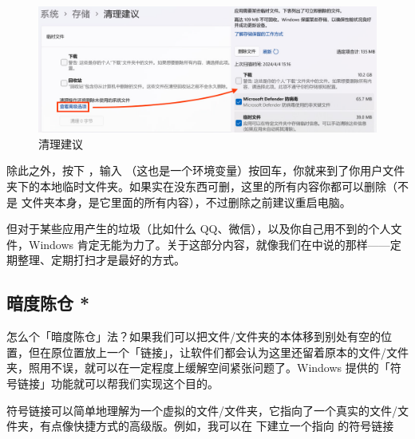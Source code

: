 {\begin{figure}[htb!]
  \centering
  \includegraphics[width=.9\textwidth]{assets/advanced/Clean_Suggestion.jpg}
  \caption{清理建议}
  \label{fig:Clean_Suggestion}
\end{figure}

除此之外，按下 ，输入 \hspace{1pt}（这也是一个环境变量）按回车，你就来到了你用户文件夹下的本地临时文件夹。如果实在没东西可删，这里的所有内容你都可以删除（不是  文件夹本身，是它里面的所有内容），不过删除之前建议重启电脑。

但对于某些应用产生的垃圾（比如什么 QQ、微信），以及你自己用不到的个人文件，Windows 肯定无能为力了。关于这部分内容，就像我们在中说的那样——定期整理、定期打扫才是最好的方式。

\subsection{暗度陈仓 *}

怎么个「暗度陈仓」法？如果我们可以把文件/文件夹的本体移到别处有空的位置，但在原位置放上一个「链接」，让软件们都会认为这里还留着原本的文件/文件夹，照用不误，就可以在一定程度上缓解空间紧张问题了。Windows 提供的「符号链接」功能就可以帮我们实现这个目的。

符号链接可以简单地理解为一个虚拟的文件/文件夹，它指向了一个真实的文件/文件夹，有点像快捷方式的高级版。例如，我可以在  下建立一个指向  的符号链接 }
